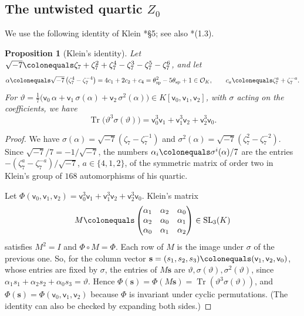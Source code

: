 \documentclass[12pt]{amsart}
\newcommand{\OO}{{\mathcal O}}
\newcommand{\sfv}{\mathsf{v}}
\DeclareMathOperator{\spc}{sp}
\DeclareMathOperator{\Tr}{Tr}
\newcommand{\SL}{\operatorname{SL}}
\numberwithin{equation}{section}
\newtheorem{proposition}[theorem]{Proposition}
\theoremstyle{definition}
\begin{document}
\subsection{The untwisted quartic \texorpdfstring{$Z_0$}{Z0}}
We use the following identity of Klein \cite{Klein-1879}*{\S 5}; see also
\cite{Elkies-99}*{(1.3)}.
\begin{proposition}[Klein's identity]
  \label{prop:klein-identity}
  Let $\sqrt{-7} \colonequals \zeta_7 + \zeta_7^2 + \zeta_7^4 - \zeta_7^3 -
  \zeta_7^5 - \zeta_7^6$, and let
  \begin{equation}
    \label{eq:alpha}
    \alpha \colonequals \sqrt{-7}\,\bigl(\zeta_7^{4} - \zeta_7^{-4}\bigr)
    = 4c_1 + 2c_2 + c_4
    = \theta_{\spc}^{2} - 5\theta_{\spc} + 1 \in \OO_K ,
    \qquad c_a \colonequals \zeta_7^{a} + \zeta_7^{-a}.
  \end{equation}
  For $\vartheta = \tfrac{1}{7}\bigl(\sfv_0\,\alpha + \sfv_1\,\sigma(\alpha) +
  \sfv_2\,\sigma^{2}(\alpha)\bigr) \in K[\sfv_0,\sfv_1,\sfv_2]$, with $\sigma$
  acting on the coefficients, we have
  \[
    \Tr\bigl(\vartheta^{3}\sigma(\vartheta)\bigr) = \sfv_0^{3}\sfv_1 + \sfv_1^{3}\sfv_2 + \sfv_2^{3}\sfv_0 .
  \]
\end{proposition}
\begin{proof}
  We have $\sigma(\alpha) = \sqrt{-7}(\zeta_7 - \zeta_7^{-1})$ and
  $\sigma^2(\alpha) = \sqrt{-7}(\zeta_7^2 - \zeta_7^{-2})$. Since $\sqrt{-7}/7 =
  -1/\sqrt{-7}$, the numbers $\alpha_i \colonequals \sigma^i(\alpha)/7$ are the
  entries $-(\zeta_7^{a} - \zeta_7^{-a})/\sqrt{-7}$, $a \in \{4,1,2\}$, of the
  symmetric matrix of order two in Klein's group of $168$ automorphisms of his
  quartic.

  Let $\Phi(\sfv_0,\sfv_1,\sfv_2) = \sfv_0^3\sfv_1 + \sfv_1^3\sfv_2 +
  \sfv_2^3\sfv_0$. Klein's matrix
  \[
    M \colonequals \begin{pmatrix*}[r] \alpha_1 & \alpha_2 & \alpha_0 \\ \alpha_2 & \alpha_0 & \alpha_1 \\ \alpha_0 & \alpha_1 & \alpha_2 \end{pmatrix*}
    \in \SL_3(K)
  \]
  satisfies $M^2 = I$ and $\Phi \circ M = \Phi$. Each row of $M$ is the image under
  $\sigma$ of the previous one. So, for the column vector
  $\mathbf{s} = (s_1,s_2,s_3) \colonequals (\sfv_1,\sfv_2,\sfv_0)$, whose entries are fixed by $\sigma$, the entries of
  $M\mathbf{s}$ are $\vartheta, \sigma(\vartheta), \sigma^{2}(\vartheta)$, since $\alpha_1 s_1 + \alpha_2 s_2 + \alpha_0 s_3 = \vartheta$. Hence
  $\Phi(\mathbf{s}) = \Phi(M\mathbf{s}) = \Tr(\vartheta^{3}\sigma(\vartheta))$, and
  $\Phi(\mathbf{s}) = \Phi(\sfv_0,\sfv_1,\sfv_2)$ because $\Phi$ is invariant under cyclic
  permutations. (The identity can also be checked by expanding both sides.)
\end{proof}
\end{document}
